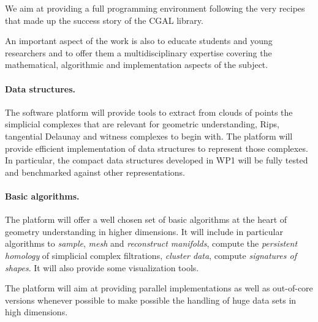 We aim at providing  a full programming environment
%
following the very recipes that made up the success story of the CGAL
library.  

An important aspect of the work is also to educate students and young
researchers and to offer them a multidisciplinary expertise covering
the mathematical, algorithmic and implementation aspects of the subject.


\paragraph{Data structures.}
The software platform will provide tools to extract from clouds of
points the simplicial complexes that are relevant for geometric
understanding, Rips, tangential Delaunay and witness complexes to
begin with.  The platform will provide efficient implementation of
data structures to represent those complexes. In
particular, the compact data structures developed in WP1 will be fully
tested and benchmarked against other representations.

\paragraph{Basic algorithms.}
The platform will offer a well chosen set of basic algorithms at the
heart of geometry understanding in higher dimensions. It will 
include in particular algorithms to
{\em sample},  {\em mesh} and {\em  reconstruct manifolds}, 
 compute the {\em persistent homology} of simplicial complex filtrations,
{\em cluster data}, compute {\em signatures of shapes}. It will also
provide some visualization tools.


The platform will aim at providing parallel implementations as well
as out-of-core versions whenever possible to make possible the
handling of huge data sets in high dimensions.

